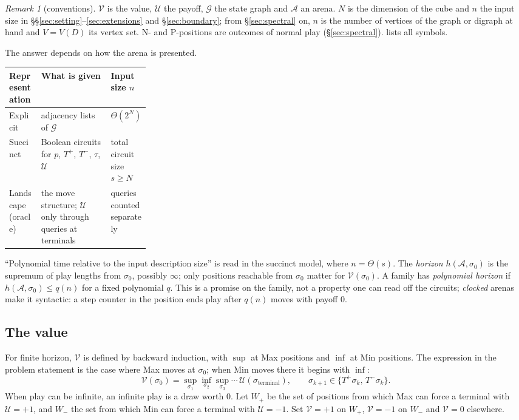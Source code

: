 \documentclass[11pt]{amsart}
\theoremstyle{plain}
\theoremstyle{definition}
\theoremstyle{remark}
\newtheorem*{remark*}{Remark}
\numberwithin{equation}{section}
\newcommand{\val}{\mathcal{V}}            %
\newcommand{\pay}{\mathcal{U}}            %
\newcommand{\SG}{\mathcal{G}}             %
\newcommand{\arena}{\mathcal{A}}          %
\begin{document}
\begin{remark*}[conventions]
$\val$ is the value, $\pay$ the payoff, $\SG$ the state graph and $\arena$ an arena. $N$ is the dimension of the cube and $n$ the input size in \S\S\ref{sec:setting}--\ref{sec:extensions} and \S\ref{sec:boundary}; from \S\ref{sec:spectral} on, $n$ is the number of vertices of the graph or digraph at hand and $V=V(D)$ its vertex set. N- and P-positions are outcomes of normal play (\S\ref{sec:spectral}).  lists all symbols.
\end{remark*}

The answer depends on how the arena is presented.

\begin{center}\small
\begin{tabularx}{\linewidth}{@{}l>{\raggedright\arraybackslash}X>{\raggedright\arraybackslash}p{0.27\linewidth}@{}}
\toprule
Representation & What is given & Input size $n$\\ \midrule
Explicit & adjacency lists of $\SG$ & $\Theta(2^N)$\\
Succinct & Boolean circuits for $p$, $T^{+}$, $T^{-}$, $\tau$, $\pay$ & total circuit size $s\ge N$\\
Landscape (oracle) & the move structure; $\pay$ only through queries at terminals & queries counted separately\\
\bottomrule
\end{tabularx}
\end{center}

``Polynomial time relative to the input description size'' is read in the succinct model, where $n=\Theta(s)$. The \emph{horizon} $h(\arena,\sigma_0)$ is the supremum of play lengths from $\sigma_0$, possibly $\infty$; only positions reachable from $\sigma_0$ matter for $\val(\sigma_0)$. A family has \emph{polynomial horizon} if $h(\arena,\sigma_0)\le q(n)$ for a fixed polynomial $q$. This is a promise on the family, not a property one can read off the circuits; \emph{clocked} arenas make it syntactic: a step counter in the position ends play after $q(n)$ moves with payoff $0$.

\subsection{The value}
For finite horizon, $\val$ is defined by backward induction, with $\sup$ at Max positions and $\inf$ at Min positions. The expression in the problem statement is the case where Max moves at $\sigma_0$; when Min moves there it begins with $\inf$:
\[
\val(\sigma_0)=\sup_{\sigma_1}\inf_{\sigma_2}\sup_{\sigma_3}\cdots\,\pay(\sigma_{\mathrm{terminal}}),\qquad \sigma_{k+1}\in\{T^{+}\sigma_k,\,T^{-}\sigma_k\}.
\]
When play can be infinite, an infinite play is a draw worth $0$. Let $W_{+}$ be the set of positions from which Max can force a terminal with $\pay=+1$, and $W_{-}$ the set from which Min can force a terminal with $\pay=-1$. Set $\val=+1$ on $W_{+}$, $\val=-1$ on $W_{-}$ and $\val=0$ elsewhere.
\end{document}
